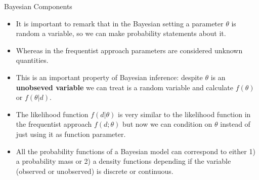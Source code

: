 \documentclass[handout]{beamer}
\begin{document}
\begin{frame}{Bayesian Components}
\scriptsize{
\begin{itemize}

\item It is important to remark that in the Bayesian setting a parameter $\theta$ is random a variable, so we can make probability statements about it.

\item Whereas in the frequentist approach parameters are considered unknown quantities. 

\item This is an important property of Bayesian inference: despite $\theta$ is an \textbf{unobseved variable} we can treat is a random variable and calculate $f(\theta)$ or $f(\theta|d)$.

\item The likelihood function  $f(d|\theta)$ is very similar to the likelihood function in the frequentist approach $f(d;\theta)$ but now we can condition on $\theta$ instead of just using it as function parameter.

\item All the probability functions of a Bayesian model can correspond to either 1) a probability mass or 2) a density functions depending if the variable (observed or unobserved) is discrete or continuous.

\end{itemize}
 } 

\end{frame}
\end{document}
